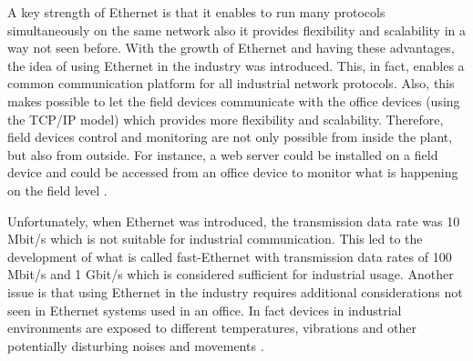 A key strength of Ethernet is that it enables to run many protocols simultaneously on the
same network also it provides flexibility and scalability in a way not seen before. With the
growth of Ethernet and having these advantages, the idea of using Ethernet in the industry was introduced.
This, in fact, enables a common communication platform for all industrial network protocols. Also, this makes possible to let the
field devices communicate with the office devices (using the \ac{TCP}/\ac{IP} model) which provides more
flexibility and scalability. Therefore, field devices control and monitoring are not only possible from
inside the plant, but also from outside. For instance, a web server could be installed on a field device
and could be accessed from an office device to monitor what is happening on the field level \cite{profinet2013ethernet}.

Unfortunately, when Ethernet was introduced, the transmission data rate was 10 Mbit/s which is not suitable for
industrial communication. This led to the development of what is called fast-Ethernet with transmission data
rates of 100 Mbit/s and 1 Gbit/s which is considered sufficient for industrial usage. Another issue is that
using Ethernet in the industry requires additional considerations not seen in Ethernet systems used in an
office. In fact devices in industrial environments are exposed to different temperatures, vibrations
and other potentially disturbing noises and movements \cite{kunbusIndustrialEthernet}.

